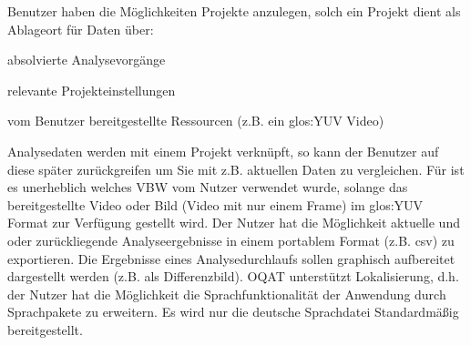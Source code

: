  Benutzer haben die Möglichkeiten Projekte anzulegen, solch ein Projekt dient als Ablageort für Daten über:
\begin{compactitem}
\item absolvierte Analysevorgänge
\item relevante Projekteinstellungen
\item vom Benutzer bereitgestellte Ressourcen (z.B. ein \gls{glos:YUV} Video)
\end{compactitem}
 	Analysedaten werden mit einem Projekt verknüpft, so kann der Benutzer auf diese später zurückgreifen um Sie mit z.B. aktuellen Daten zu vergleichen.
 Für \projektTitel ist es unerheblich welches \gls{VBW} vom Nutzer verwendet wurde, solange das bereitgestellte Video oder Bild (Video mit nur einem Frame) im \gls{glos:YUV} Format zur Verfügung gestellt wird.
 Der Nutzer hat die Möglichkeit aktuelle und oder zurückliegende Analyseergebnisse in einem portablem Format (z.B. \gls{csv}) zu exportieren.
 Die Ergebnisse eines Analysedurchlaufs sollen graphisch aufbereitet dargestellt werden (z.B. als Differenzbild).
 \gls{OQAT} unterstützt Lokalisierung, d.h. der Nutzer hat die Möglichkeit die Sprachfunktionalität der Anwendung durch Sprachpakete zu erweitern. Es wird nur die deutsche Sprachdatei Standardmäßig bereitgestellt.
